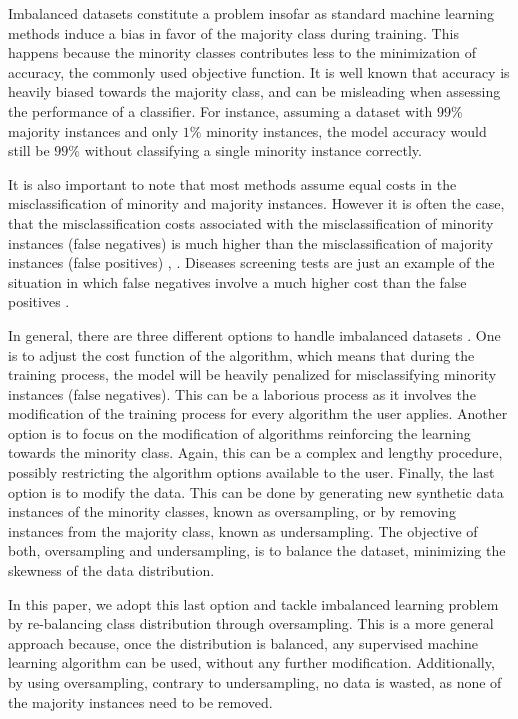 \documentclass[parskip=full]{scrartcl}
\begin{document}
Imbalanced datasets constitute a problem insofar as standard machine learning methods induce a bias in favor of the majority class during training. This happens because the minority classes contributes less to the minimization of accuracy, the commonly used objective function. It is well known that accuracy is heavily biased towards the majority class, and can be misleading when assessing the performance of a classifier. For instance, assuming a dataset with $ 99\% $ majority instances and only $ 1\% $ minority instances, the model accuracy would still be $ 99\% $ without classifying a single minority instance correctly.

It is also important to note that most methods assume equal costs in the misclassification of minority and majority instances. However it is often the case, that the misclassification costs associated with the misclassification of minority instances (false negatives) is much higher than the misclassification of majority instances (false positives) \cite{Domingos1999}, \cite{Ting2002}. Diseases screening tests are just an example of the situation in which false negatives involve a much higher cost than the false positives \cite{Wan2014}.

In general, there are three different options to handle imbalanced datasets \cite{Fernandez2013}. One is to adjust the cost function of the algorithm, which means that during the training process, the model will be heavily penalized for misclassifying minority instances (false negatives). This can be a laborious process as it involves the modification of the training process for every algorithm the user applies. Another option is to focus on the modification of algorithms reinforcing the learning towards the minority class. Again, this can be a complex and lengthy procedure, possibly restricting the algorithm options available to the user. Finally, the last option is to modify the data. This can be done by generating new synthetic data instances of the minority classes, known as oversampling, or by removing instances from the majority class, known as undersampling. The objective of both, oversampling and undersampling, is to balance the dataset, minimizing the skewness of the data distribution.

In this paper, we adopt this last option and tackle imbalanced learning problem by re-balancing class distribution through oversampling. This is a more general approach because, once the distribution is balanced, any supervised machine learning algorithm can be used, without any further modification. Additionally, by using oversampling, contrary to undersampling, no data is wasted, as none of the majority instances need to be removed.
\end{document}
